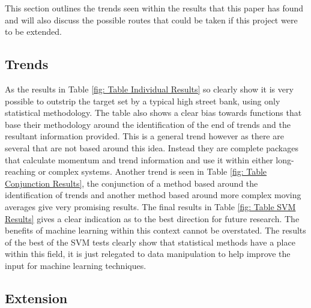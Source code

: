 \documentclass[conference]{IEEEtran}
\begin{document}

This section outlines the trends seen within the results that this paper has found and will also discuss the possible routes that could be taken if this project were to be extended.

\subsection{Trends}

As the results in Table \ref{fig: Table Individual Results} so clearly show it is very possible to outstrip the target set by a typical high street bank, using only statistical methodology. The table also shows a clear bias towards functions that base their methodology around the identification of the end of trends and the resultant information provided. This is a general trend however as there are several that are not based around this idea. Instead they are complete packages that calculate momentum and trend information and use it within either long-reaching or complex systems. 
Another trend is seen in Table \ref{fig: Table Conjunction Results}, the conjunction of a method based around the identification of trends and another method based around more complex moving averages give very promising results. 
The final results in Table \ref{fig: Table SVM Results} gives a clear indication as to the best direction for future research. The benefits of machine learning within this context cannot be overstated. The results of the best of the SVM tests clearly show that statistical methods have a place within this field, it is just relegated to data manipulation to help improve the input for machine learning techniques.\\

\subsection{Extension}
\end{document}
